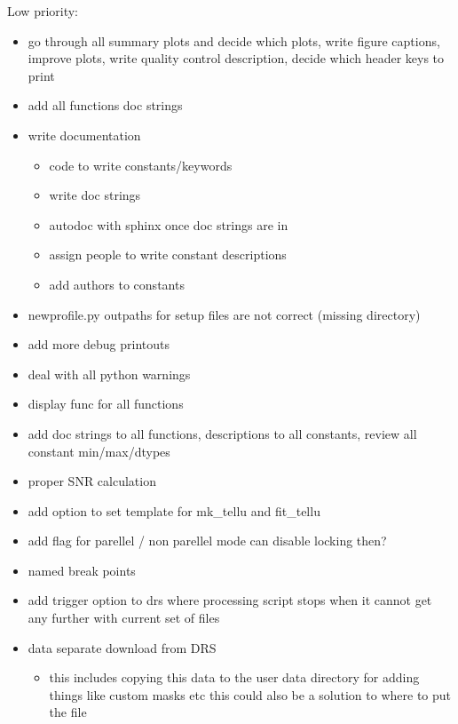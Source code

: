 \documentclass[a4paper,10pt,english]{report}
\begin{document}
Low priority:
\begin{itemize}
\item {} 
go through all summary plots and decide which plots, write figure captions, improve plots, write quality control description, decide which header keys to print

\item {} 
add all functions doc strings

\item {} 
write documentation
\begin{itemize}
\item {} 
code to write constants/keywords

\item {} 
write doc strings

\item {} 
autodoc with sphinx once doc strings are in

\item {} 
assign people to write constant descriptions

\item {} 
add authors to constants

\end{itemize}

\item {} 
newprofile.py outpaths for setup files are not correct (missing directory)

\item {} 
add more debug printouts

\item {} 
deal with all python warnings

\item {} 
display func for all functions

\item {} 
add doc strings to all functions, descriptions to all constants, review all constant min/max/dtypes

\item {} 
proper SNR calculation

\item {} 
add option to set template for mk\_tellu and fit\_tellu

\item {} 
add flag for parellel / non parellel mode \sphinxhyphen{} can disable locking then?

\item {} 
named break points

\item {} 
add trigger option to drs where processing script stops when it cannot get any further with current set of files

\item {} 
data separate download from DRS
\begin{itemize}
\item {} 
this includes copying this data to the user data directory for adding
things like custom masks etc \sphinxhyphen{} this could also be a solution to
where to put the  file

\end{itemize}

\end{itemize}
\end{document}
